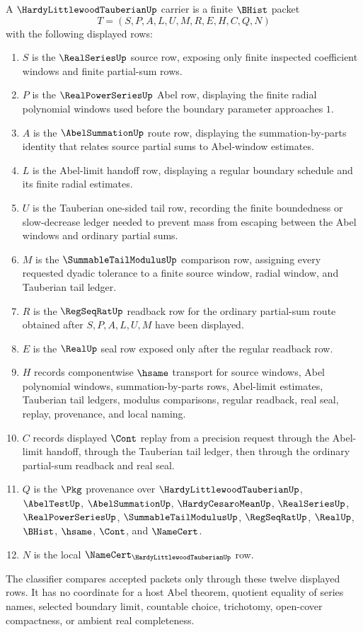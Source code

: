 \begin{definition}
\label{def:hardy-littlewood-tauberian-carrier}
A $\HardyLittlewoodTauberianUp$ carrier is a finite $\BHist$ packet
$$
T=(S,P,A,L,U,M,R,E,H,C,Q,N)
$$
with the following displayed rows:
\begin{enumerate}
\item $S$ is the $\RealSeriesUp$ source row, exposing only finite inspected coefficient windows and finite partial-sum rows.
\item $P$ is the $\RealPowerSeriesUp$ Abel row, displaying the finite radial polynomial windows used before the boundary parameter approaches $1$.
\item $A$ is the $\AbelSummationUp$ route row, displaying the summation-by-parts identity that relates source partial sums to Abel-window estimates.
\item $L$ is the Abel-limit handoff row, displaying a regular boundary schedule and its finite radial estimates.
\item $U$ is the Tauberian one-sided tail row, recording the finite boundedness or slow-decrease ledger needed to prevent mass from escaping between the Abel windows and ordinary partial sums.
\item $M$ is the $\SummableTailModulusUp$ comparison row, assigning every requested dyadic tolerance to a finite source window, radial window, and Tauberian tail ledger.
\item $R$ is the $\RegSeqRatUp$ readback row for the ordinary partial-sum route obtained after $S,P,A,L,U,M$ have been displayed.
\item $E$ is the $\RealUp$ seal row exposed only after the regular readback row.
\item $H$ records componentwise $\hsame$ transport for source windows, Abel polynomial windows, summation-by-parts rows, Abel-limit estimates, Tauberian tail ledgers, modulus comparisons, regular readback, real seal, replay, provenance, and local naming.
\item $C$ records displayed $\Cont$ replay from a precision request through the Abel-limit handoff, through the Tauberian tail ledger, then through the ordinary partial-sum readback and real seal.
\item $Q$ is the $\Pkg$ provenance over $\HardyLittlewoodTauberianUp$, $\AbelTestUp$, $\AbelSummationUp$, $\HardyCesaroMeanUp$, $\RealSeriesUp$, $\RealPowerSeriesUp$, $\SummableTailModulusUp$, $\RegSeqRatUp$, $\RealUp$, $\BHist$, $\hsame$, $\Cont$, and $\NameCert$.
\item $N$ is the local $\NameCert_{\HardyLittlewoodTauberianUp}$ row.
\end{enumerate}
The classifier compares accepted packets only through these twelve displayed rows. It has no coordinate for a host Abel theorem, quotient equality of series names, selected boundary limit, countable choice, trichotomy, open-cover compactness, or ambient real completeness.
\end{definition}

